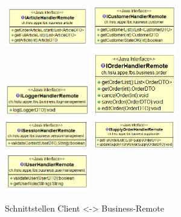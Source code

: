 \begin{figure}[H]
    {\includegraphics[width=0.33\textwidth]{Images/IArticleHandlerRemonte}} 
    {\includegraphics[width=0.33\textwidth]{Images/ICustomerHandlerRemonte}} 
    {\includegraphics[width=0.33\textwidth]{Images/ILoggerHandlerRemonte}} 
    \newline
    {\includegraphics[width=0.33\textwidth]{Images/IOrderHandlerRemonte}} 
    {\includegraphics[width=0.33\textwidth]{Images/ISessionHandlerRemonte}} 
    {\includegraphics[width=0.33\textwidth]{Images/ISupplyOrderHandlerRemonte}} 
    \newline
    {\includegraphics[width=0.33\textwidth]{Images/IUserHandlerRemonte}} 
\caption{Schnittstellen Client <-> Business-Remote } 
\end{figure} 



